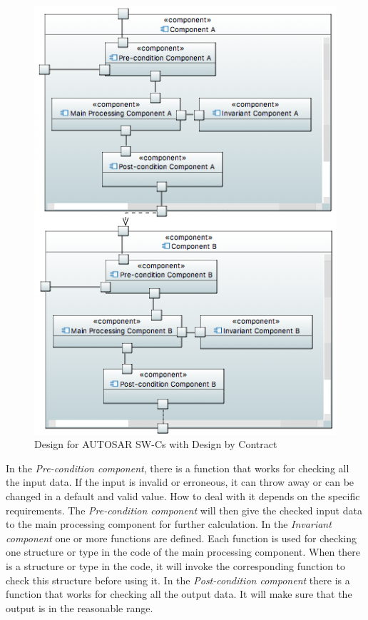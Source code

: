 \begin{figure}[t]
\centering
\includegraphics[width=.85\columnwidth]{figure/component11.png}
\caption{Design for AUTOSAR SW-Cs with Design by Contract}
\label{fig:solution}
\end{figure}

In the {\em Pre-condition component}, there is a function that works for checking all the input data. If the input is invalid or erroneous, it can throw away or can be changed in %
a default and valid value. How to deal with it depends on the specific requirements. The {\em Pre-condition component} will then give the checked input data to the main processing component for further calculation. In the {\em Invariant component} one or more functions are defined. Each function is used for checking one structure or type in the code of the main processing component. When there is a structure or type in the code, it will invoke the corresponding function to check this structure before using it. In the {\em Post-condition component} there is a function that works for checking all the output data. It will make sure that the output is in the reasonable range. 

